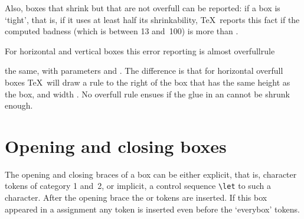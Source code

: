 \documentclass{book}
\begin{document}
Also, boxes that shrink but that are not overfull can be reported:
if a box is `tight', that is, if it uses at least half its
shrinkability, \TeX\ reports this fact if the
computed badness (which is between 13 and~100) is more than
.

For horizontal and vertical boxes this error reporting is almost
\cstoidx overfullrule\par
the same, with parameters  and .
The difference is that for horizontal overfull boxes
\TeX\ will draw a rule to the right of the box that has the
same height as the box, and width .
No overfull rule ensues if
the  glue in an  cannot be
shrunk enough.

\section{Opening and closing boxes}

The opening and closing braces of a box can be either explicit, that
is, character tokens of category 1
and~2, or implicit, a control sequence \verb=\let=
to such a character.  After the opening brace the  or
 tokens are inserted.  If this box appeared in a
 assignment any  token is
inserted even before the `everybox' tokens.
\end{document}
